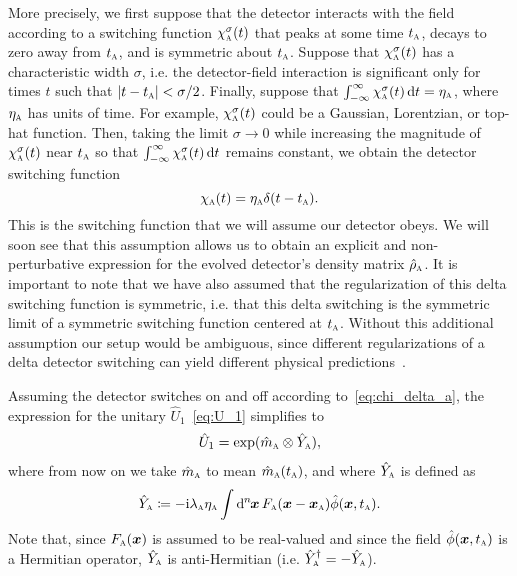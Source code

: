 \documentclass[pra,nofootinbib,floats,aps,twocolumn,tightenlines,superscriptaddress]{revtex4-1}
\renewcommand*\d[2][]{%
	\mathrm{d}%
	\ifx\relax#1\relax\else
	\rule{-0.02em}{1.5ex}^{#1}\rule{0.08em}{0ex}\!
	\fi
	#2\,
}
\newcommand{\ii}{\mathrm{i}}
\newcommand{\rhoa}{\hat{\rho}_\textsc{a}}
\newcommand{\ma}{\hat{m}_\textsc{a}}
\newcommand{\Ya}{\hat{Y}_\textsc{a}}
\begin{document}
More precisely, we first suppose that the detector interacts with the field according to a switching function $\chi_\textsc{a}^\sigma(t)$ that peaks at some time $t_\textsc{a}$, decays to zero away from $t_\textsc{a}$, and is symmetric about $t_\textsc{a}$. Suppose that $\chi_\textsc{a}^\sigma(t)$ has a characteristic width $\sigma$, i.e. the detector-field interaction is significant only for times $t$ such that $|t-t_\textsc{a}|<\sigma/2$. Finally, suppose that $\int_{-\infty}^\infty  \chi_\textsc{a}^\sigma(t) \dif t=\eta_\textsc{a}$, where $\eta_\textsc{a}$ has units of time. For example, $\chi_\textsc{a}^\sigma(t)$ could be a Gaussian, Lorentzian, or top-hat function. Then, taking the limit $\sigma\rightarrow 0$ while increasing the magnitude of $\chi_\textsc{a}^\sigma(t)$ near $t_\textsc{a}$ so that $\int_{-\infty}^\infty \chi_\textsc{a}^\sigma(t) \dif t$ remains constant, we obtain the detector switching function
\begin{equation}
\label{eq:chi_delta_a}
    \chi_\textsc{a}(t)
    =
    \eta_\textsc{a}\delta(t-t_\textsc{a}).
\end{equation}
This is the switching function that we will assume our detector obeys. We will soon see that this assumption allows us to obtain an explicit and non-perturbative expression for the evolved detector's density matrix $\rhoa$. It is important to note that we have also assumed that the regularization of this delta switching function is symmetric, i.e. that this delta switching is the symmetric limit of a symmetric switching function centered at $t_\textsc{a}$. Without this additional assumption our setup would be ambiguous, since different regularizations of a delta detector switching can yield different physical predictions~\cite{Pozas2017}. 

Assuming the detector switches on and off according to~\eqref{eq:chi_delta_a}, the expression for the unitary $\hat{U}_1$~\eqref{eq:U_1} simplifies to 
\begin{align}
\label{eq:U_1_v2}
    \hat{U}_1
    =
    \exp(\ma\otimes\Ya),
\end{align}
where from now on we take $\hat{m}_\textsc{a}$ to mean $\hat{m}_\textsc{a}(t_\textsc{a})$, and where $\Ya$ is defined as
\begin{equation}
\label{eq:Ya}
    \hat{Y}_\textsc{a}
    \coloneqq
    -\ii \lambda_\textsc{a}
    \eta_\textsc{a}
    \int\d[n]{\bm x}
    F_\textsc{a}(\bm{x}-\bm{x}_\textsc{a})
    \hat{\phi}(\bm{x},t_\textsc{a}).
\end{equation}
Note that, since $F_\textsc{a}(\bm x)$ is assumed to be real-valued and since the field $\hat{\phi}(\bm{x},t_\textsc{a})$ is a Hermitian operator, $\Ya$ is anti-Hermitian (i.e. $\Ya^\dagger=-\Ya$).
\end{document}
